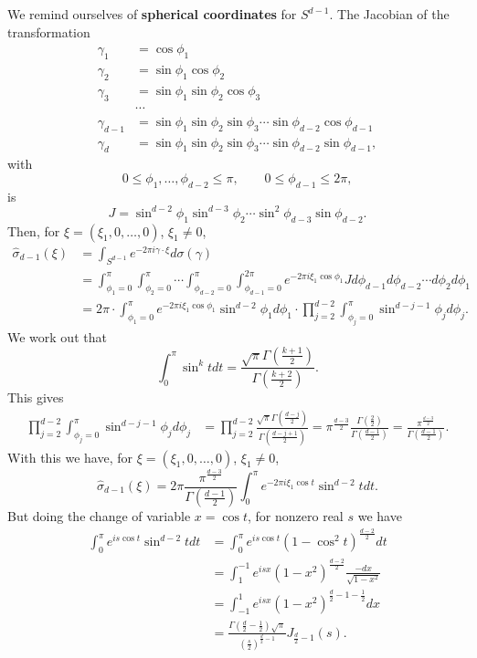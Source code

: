 \documentclass{article}
\begin{document}
We remind ourselves of \textbf{spherical coordinates} for $S^{d-1}$. The Jacobian of the transformation
\begin{align*}
\gamma_1&=\cos \phi_1\\
\gamma_2&=\sin \phi_1 \cos \phi_2\\
\gamma_3&=\sin \phi_1 \sin \phi_2 \cos \phi_3\\
&\cdots\\
\gamma_{d-1}&=\sin \phi_1 \sin \phi_2 \sin \phi_3 \cdots \sin \phi_{d-2} \cos \phi_{d-1}\\
\gamma_d&=\sin \phi_1 \sin \phi_2 \sin \phi_3 \cdots \sin \phi_{d-2} \sin \phi_{d-1},
\end{align*}
with
\[
0 \leq \phi_1, \ldots, \phi_{d-2} \leq \pi, \qquad 0 \leq \phi_{d-1} \leq 2\pi,
\]
is
\[
J=\sin^{d-2} \phi_1 \sin^{d-3} \phi_2 \cdots \sin^2 \phi_{d-3} \sin \phi_{d-2}.
\]
Then, for $\xi=(\xi_1,0,\ldots,0)$, $\xi_1 \neq 0$,
\begin{align*}
\widehat{\sigma}_{d-1}(\xi)&=\int_{S^{d-1}} e^{-2\pi i\gamma\cdot \xi} d\sigma(\gamma)\\
&=\int_{\phi_1=0}^\pi \int_{\phi_2=0}^\pi \cdots \int_{\phi_{d-2}=0}^\pi \int_{\phi_{d-1}=0}^{2\pi} 
e^{-2\pi i\xi_1 \cos \phi_1}  J d\phi_{d-1} d\phi_{d-2} \cdots d\phi_2 d\phi_1\\
&=2\pi \cdot \int_{\phi_1=0}^\pi e^{-2\pi i\xi_1 \cos \phi_1} \sin^{d-2} \phi_1 d\phi_1 \cdot \prod_{j=2}^{d-2} \int_{\phi_j=0}^\pi \sin^{d-j-1} \phi_j d\phi_j.
\end{align*}
We work out that
\[
\int_0^\pi \sin^k t dt = \frac{\sqrt{\pi} \Gamma\left(\frac{k+1}{2}\right)}{\Gamma\left(\frac{k+2}{2}\right)}.
\]
This gives
\begin{align*}
\prod_{j=2}^{d-2} \int_{\phi_j=0}^\pi \sin^{d-j-1} \phi_j d\phi_j&=
\prod_{j=2}^{d-2} \frac{\sqrt{\pi} \Gamma\left( \frac{d-j}{2}  \right)}{\Gamma\left( \frac{d-j+1}{2} \right)}
=\pi^{\frac{d-3}{2}} \frac{\Gamma\left(\frac{2}{2}\right)}{\Gamma\left(\frac{d-1}{2}\right)}
=\frac{\pi^{\frac{d-3}{2}}}{\Gamma\left(\frac{d-1}{2}\right)}.
\end{align*}
With this we have, for $\xi=(\xi_1,0,\ldots,0)$, $\xi_1 \neq 0$,
\[
\widehat{\sigma}_{d-1}(\xi) = 2\pi \frac{\pi^{\frac{d-3}{2}}}{\Gamma\left(\frac{d-1}{2}\right)} \int_0^\pi e^{-2\pi i\xi_1 \cos t} \sin^{d-2} t dt.
\]
But doing the change of variable $x=\cos t$, for nonzero real $s$ we have
\begin{align*}
\int_0^\pi e^{is\cos t} \sin^{d-2}t dt &=\int_0^\pi e^{is\cos t} (1-\cos^2 t)^{\frac{d-2}{2}} dt\\
&=\int_1^{-1} e^{isx}(1-x^2)^{\frac{d-2}{2}} \frac{-dx}{\sqrt{1-x^2}}\\
&=\int_{-1}^1 e^{isx} (1-x^2)^{\frac{d}{2}-1-\frac{1}{2}} dx\\
&=\frac{\Gamma\left(\frac{d}{2}-\frac{1}{2} \right)\sqrt{\pi}}{\left(\frac{s}{2}\right)^{\frac{d}{2}-1}} J_{\frac{d}{2}-1}(s).
\end{align*}
\end{document}
